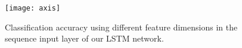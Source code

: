 \begin{figure}[h]
	\centering
	\texttt{[image: axis]}
	\caption{Classification accuracy using different feature dimensions in the sequence input layer of our LSTM network.}
	\label{fig:axis}
\end{figure}











%

